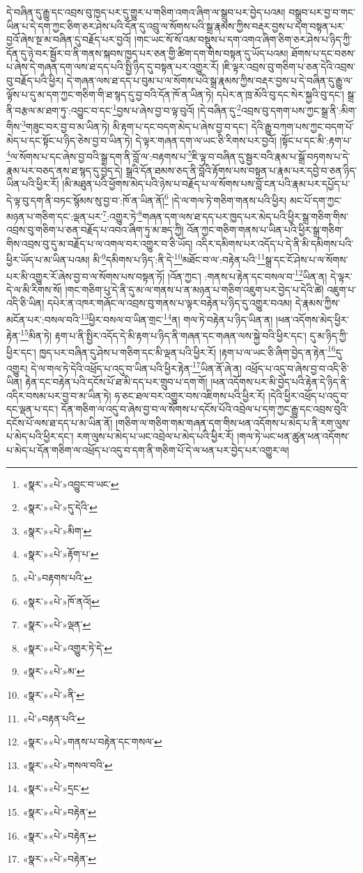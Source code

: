དེ་བཞིན་དུ་རྒྱུ་དང་འབྲས་བུ་ཁྱད་པར་དུ་གྱུར་པ་གཅིག་འགའ་ཞིག་ལ་སྒྲུབ་པར་བྱེད་པའམ། བསྒྲུབ་པར་བྱ་བ་གང་ཡིན་པ་དེ་དག་ཀྱང་ཅིག་ཅར་ཤེས་པའི་དོན་དུ་འབྲུ་ལ་སོགས་པའི་སྒྲ་རྣམས་ཀྱིས་བརྡར་བྱས་པ་དག་བསྟན་པར་བྱའོ་ཞེས་སྔ་མ་བཞིན་དུ་བརྗོད་པར་བྱའོ། །གང་ཡང་སོ་སོ་འམ་བསྡུས་པ་དག་འགའ་ཞིག་ཅིག་ཅར་ཤེས་པ་ཉིད་ཀྱི་དོན་དུ་ཉེ་བར་སྦྱོར་བ་ནི་གནས་སྐབས་ཁྱད་པར་ཅན་གྱི་ཚིག་དག་གིས་བསྟན་དུ་ཡོད་པའམ། ཐོགས་པ་དང་བཅས་པ་ཞེས་དེ་གཞན་དག་ལས་ཐ་དད་པའི་སྤྱི་ཉིད་དུ་བསྟན་པར་འགྱུར་རོ། །ཇི་ལྟར་འབྲས་བུ་གཅིག་པ་ཅན་དེའི་འབྲས་བུ་བརྗོད་པའི་ཕྱིར། དེ་གཞན་ལས་ཐ་དད་པ་བུམ་པ་ལ་སོགས་པའི་སྒྲ་རྣམས་ཀྱིས་བརྡར་བྱས་པ་དེ་བཞིན་དུ་རྒྱུ་ལ་ལྟོས་པ་དུ་མ་དག་ཀྱང་གཅིག་གི་ཐ་སྙད་དུ་བྱ་བའི་དོན་ཁོ་ན་ཡིན་ཏེ། དཔེར་ན་ཁྲ་མོའི་བུ་དང་སེར་སྐྱའི་བུ་དང་། སྒྲ་ནི་བརྩལ་མ་ཐག་ཏུ་:འབྱུང་བ་དང་\footnote{«སྣར་»«པེ་»འབྱུང་བ་ཡང་}བྱས་པ་ཞེས་བྱ་བ་ལྟ་བུའོ། །དེ་བཞིན་དུ་\footnote{«སྣར་»«པེ་»དུ་དེའི་}འབྲས་བུ་དགག་པས་ཀྱང་སྒྲ་ནི་:མིག་གིས་\footnote{«སྣར་»«པེ་»མིག་}གཟུང་བར་བྱ་བ་མ་ཡིན་ཏེ། མི་རྟག་པ་དང་བདག་མེད་པ་ཞེས་བྱ་བ་དང་། དེའི་རྒྱུ་བཀག་པས་ཀྱང་བདག་པོ་མེད་པ་དང་སྟོང་པ་ཉིད་ཅེས་བྱ་བ་ཡིན་ཏེ། དེ་ལྟར་གཞན་དག་ལ་ཡང་ཅི་རིགས་པར་བྱའོ། །སྟོང་པ་དང་མི་:རྟག་པ་\footnote{«སྣར་»«པེ་»རྟོག་པ་}ལ་སོགས་པ་དང་ཞེས་བྱ་བའི་སྒྲ་དག་ནི་བློ་ལ་:བརྟགས་པ་\footnote{«པེ་»བརྟགས་པའི་}ཇི་ལྟ་བ་བཞིན་དུ་སྦྱར་བའི་རྣམ་པ་སྒྲོ་བཏགས་པ་དེ་རྣམ་པར་བཅད་ནས་ཐ་སྙད་དུ་བྱེད་དེ། སྒྲའི་དོན་ཐམས་ཅད་ནི་བློའི་རྟོགས་པས་བསྟན་པ་རྣམ་པར་དབྱེ་བ་ཅན་ཉིད་ཡིན་པའི་ཕྱིར་རོ། །མི་མཐུན་པའི་ཕྱོགས་མེད་པའི་ཉེས་པ་བརྗོད་པ་ལ་སོགས་པས་བློ་ངན་པའི་རྣམ་པར་དཔྱོད་པ་དེ་ལྟ་བུ་དག་ནི་བཏང་སྙོམས་སུ་བྱ་བ་:ཁོ་ན་ཡིན་ནོ།\footnote{«སྣར་»«པེ་»ཁོ་ནའོ།} །དེ་ལ་གལ་ཏེ་གཅིག་གནས་པའི་ཕྱིར། མང་པོ་དག་ཀྱང་མཉན་པ་གཅིག་དང་:ལྡན་པར་\footnote{«སྣར་»«པེ་»ལྡན་}:འགྱུར་ཏེ་\footnote{«སྣར་»«པེ་»འགྱུར་ཏེ་དེ་}གཞན་དག་ལས་ཐ་དད་པར་ཁྱད་པར་མེད་པའི་ཕྱིར་སྒྲ་གཅིག་གིས་འབྲས་བུ་གཅིག་པ་ཅན་བརྗོད་པ་འབའ་ཞིག་ཏུ་མ་ཟད་ཀྱི། འོན་ཀྱང་གཅིག་གནས་པ་ཡིན་པའི་ཕྱིར་སྒྲ་གཅིག་གིས་འབྲས་བུ་དུ་མ་བརྗོད་པ་ལ་འགལ་བར་འགྱུར་བ་ཅི་ཡོད། འདིར་དམིགས་པར་འདོད་པ་དེ་ནི་མི་དམིགས་པའི་ཕྱིར་ཡོད་པ་མ་ཡིན་པའམ། མི་\footnote{«སྣར་»«པེ་»མ་}དམིགས་པ་ཉིད་:ནི་དེ་\footnote{«སྣར་»«པེ་»ནི་}མཐོང་བ་ལ་:བརྟེན་པའི་\footnote{«པེ་»བརྟན་པའི་}སྒྲ་དང་ངོ་ཤེས་པ་ལ་སོགས་པར་མི་འགྱུར་རོ་ཞེས་བྱ་བ་ལ་སོགས་པས་བསྟན་ཏོ། །འོན་ཀྱང་། :གནས་པ་རྟེན་དང་བསལ་བ་\footnote{«སྣར་»«པེ་»གནས་པ་བརྟེན་དང་གསལ་}ཡིན་ན། དེ་ལྟར་དེ་ལ་མི་རིགས་སོ། །གང་གཅིག་པུ་དེ་ནི་དུ་མ་ལ་གནས་པ་ན་མཉན་པ་གཅིག་འཇུག་པར་བྱེད་པ་དེའི་ཚེ། འཇུག་པ་འདི་ཅི་ཡིན། དཔེར་ན་འཁར་གཞོང་ལ་འབྲས་བུ་གནས་པ་ལྟར་བརྟེན་པ་ཉིད་དུ་འགྱུར་བའམ། དེ་རྣམས་ཀྱིས་མངོན་པར་:བསལ་བའི་\footnote{«སྣར་»«པེ་»གསལ་བའི་}ཕྱིར་བསལ་བ་ཡིན་གྲང་\footnote{«སྣར་»«པེ་»དྲང་}ན། གལ་ཏེ་བརྟེན་པ་ཉིད་ཡིན་ན། །ཕན་འདོགས་མེད་ཕྱིར་རྟེན་\footnote{«སྣར་»«པེ་»བརྟེན་}མིན་ཏེ། རྟག་པ་ནི་སྤྱིར་འདོད་དེ་མི་རྟག་པ་ཉིད་ནི་གཞན་དང་གཞན་ལས་སྐྱེ་བའི་ཕྱིར་དང་། དུ་མ་ཉིད་ཀྱི་ཕྱིར་དང་། ཁྱད་པར་བཞིན་དུ་ཤེས་པ་གཅིག་དང་མི་ལྡན་པའི་ཕྱིར་རོ། །རྟག་པ་ལ་ཡང་ཅི་ཞིག་བྱེད་ན་རྟེན་\footnote{«སྣར་»«པེ་»བརྟེན་}དུ་འགྱུར། དེ་ལ་གལ་ཏེ་དེའི་འཕྲོད་པ་འདུ་བ་ཡིན་པའི་ཕྱིར་རྟེན་\footnote{«སྣར་»«པེ་»བརྟེན་}ཡིན་ནོ་ཞེ་ན། འཕྲོད་པ་འདུ་བ་ཞེས་བྱ་བ་འདི་ཅི་ཡིན། རྟེན་དང་བརྟེན་པའི་དངོས་པོ་ཐ་མི་དད་པར་གྲུབ་པ་དག་གོ། །ཕན་འདོགས་པར་མི་བྱེད་པའི་རྟེན་དེ་ཉིད་ནི་འདིར་བསམ་པར་བྱ་བ་མ་ཡིན་ཏེ། ཧ་ཅང་ཐལ་བར་འགྱུར་བས་འཇིགས་པའི་ཕྱིར་རོ། །དེའི་ཕྱིར་འཕྲོད་པ་འདུ་བ་དང་ལྡན་པ་དང་། དོན་གཅིག་ལ་འདུ་བ་ཞེས་བྱ་བ་ལ་སོགས་པ་དངོས་པོའི་འབྲེལ་པ་དག་ཀྱང་རྒྱུ་དང་འབྲས་བུའི་དངོས་པོ་ལས་ཐ་དད་པ་མ་ཡིན་ནོ། །གཅིག་ལ་གཅིག་གམ་གཞན་དག་གིས་ཕན་འདོགས་པ་མེད་པ་ནི་རག་ལུས་པ་མེད་པའི་ཕྱིར་དང་། རག་ལུས་པ་མེད་པ་ཡང་འབྲེལ་པ་མེད་པའི་ཕྱིར་རོ། །གལ་ཏེ་ཡང་ཕན་ཚུན་ཕན་འདོགས་པ་མེད་པ་དོན་གཅིག་ལ་འཕྲོད་པ་འདུ་བ་དག་ནི་གཅིག་པོ་དེ་ལ་ཕན་པར་བྱེད་པར་འགྱུར་ལ། 